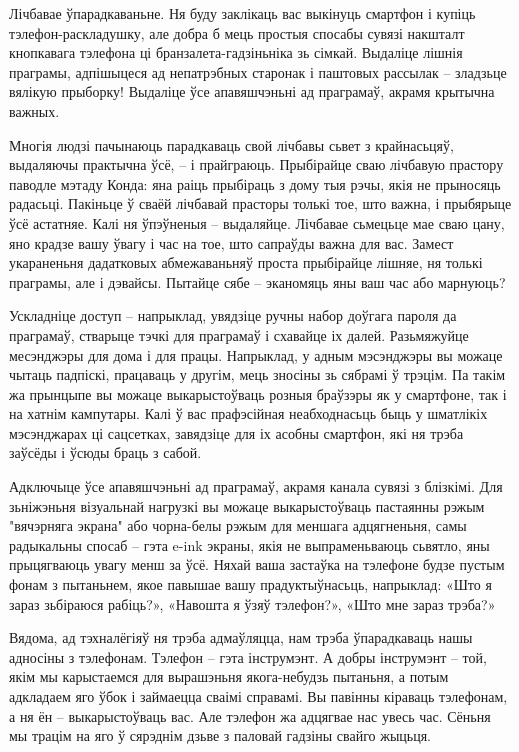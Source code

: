 Лічбавае ўпарадкаваньне. Ня буду заклікаць вас выкінуць смартфон і купіць тэлефон-раскладушку, але добра б мець простыя спосабы сувязі накшталт кнопкавага тэлефона ці бранзалета-гадзіньніка зь сімкай. Выдаліце лішнія праграмы, адпішыцеся ад непатрэбных старонак і паштовых рассылак – зладзьце вялікую прыборку! Выдаліце ўсе апавяшчэньні ад праграмаў, акрамя крытычна важных.

Многія людзі пачынаюць парадкаваць свой лічбавы сьвет з крайнасьцяў, выдаляючы практычна ўсё, – і прайграюць. Прыбірайце сваю лічбавую прастору паводле мэтаду Конда: яна раіць прыбіраць з дому тыя рэчы, якія не прыносяць радасьці. Пакіньце ў сваёй лічбавай прасторы толькі тое, што важна, і прыбярыце ўсё астатняе. Калі ня ўпэўненыя – выдаляйце. Лічбавае сьмецьце мае сваю цану, яно крадзе вашу ўвагу і час на тое, што сапраўды важна для вас. Замест укараненьня дадатковых абмежаваньняў проста прыбірайце лішняе, ня толькі праграмы, але і дэвайсы. Пытайце сябе – эканомяць яны ваш час або марнуюць?

Ускладніце доступ – напрыклад, увядзіце ручны набор доўгага пароля да праграмаў, стварыце тэчкі для праграмаў і схавайце іх далей. Разьмяжуйце месэнджэры для дома і для працы. Напрыклад, у адным мэсэнджэры вы можаце чытаць падпіскі, працаваць у другім, мець зносіны зь сябрамі ў трэцім. Па такім жа прынцыпе вы можаце выкарыстоўваць розныя браўзэры як у смартфоне, так і на хатнім кампутары. Калі ў вас прафэсійная неабходнасьць быць у шматлікіх мэсэнджарах ці сацсетках, завядзіце для іх асобны смартфон, які ня трэба заўсёды і ўсюды браць з сабой.

Адключыце ўсе апавяшчэньні ад праграмаў, акрамя канала сувязі з блізкімі. Для зьніжэньня візуальнай нагрузкі вы можаце выкарыстоўваць пастаянны рэжым "вячэрняга экрана" або чорна-белы рэжым для меншага адцягненьня, самы радыкальны спосаб – гэта e-ink экраны, якія не выпраменьваюць сьвятло, яны прыцягваюць увагу менш за ўсё. Няхай ваша застаўка на тэлефоне будзе пустым фонам з пытаньнем, якое павышае вашу прадуктыўнасьць, напрыклад: «Што я зараз зьбіраюся рабіць?», «Навошта я ўзяў тэлефон?», «Што мне зараз трэба?»

Вядома, ад тэхналёгіяў ня трэба адмаўляцца, нам трэба ўпарадкаваць нашы адносіны з тэлефонам. Тэлефон – гэта інструмэнт. А добры інструмэнт – той, якім мы карыстаемся для вырашэньня якога-небудзь пытаньня, а потым адкладаем яго ўбок і займаецца сваімі справамі. Вы павінны кіраваць тэлефонам, а ня ён – выкарыстоўваць вас. Але тэлефон жа адцягвае нас увесь час. Сёньня мы трацім на яго ў сярэднім дзьве з паловай гадзіны свайго жыцьця.

